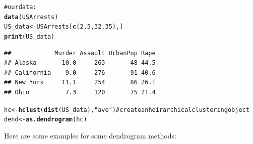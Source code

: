 \documentclass[shortnames,nojss,article]{jss}\usepackage{graphicx, color}
\makeatletter
\newcommand{\hlfunctioncall}[1]{\textcolor[rgb]{0.501960784313725,0,0.329411764705882}{\textbf{#1}}}%
\newcommand{\hlstring}[1]{\textcolor[rgb]{0.6,0.6,1}{#1}}%
\newcommand{\hlcomment}[1]{\textcolor[rgb]{0.180392156862745,0.6,0.341176470588235}{#1}}%
\newenvironment{kframe}{%
 \def\at@end@of@kframe{}%
 \ifinner\ifhmode%
  \def\at@end@of@kframe{\end{minipage}}%
  \begin{minipage}{\columnwidth}%
 \fi\fi%
 \def\FrameCommand##1{\hskip\@totalleftmargin \hskip-\fboxsep
 \colorbox{shadecolor}{##1}\hskip-\fboxsep
     \hskip-\linewidth \hskip-\@totalleftmargin \hskip\columnwidth}%
 \MakeFramed {\advance\hsize-\width
   \@totalleftmargin\z@ \linewidth\hsize
   \@setminipage}}%
 {\par\unskip\endMakeFramed%
 \at@end@of@kframe}
\newenvironment{knitrout}{}{} %
\makeatother
\begin{document}
\begin{knitrout}
\color{fgcolor}\begin{kframe}
\begin{alltt}
\hlcomment{# our data:}
\hlfunctioncall{data}(USArrests)
US_data <- USArrests[\hlfunctioncall{c}(2, 5, 32, 35), ]
\hlfunctioncall{print}(US_data)
\end{alltt}
\begin{verbatim}
##            Murder Assault UrbanPop Rape
## Alaska       10.0     263       48 44.5
## California    9.0     276       91 40.6
## New York     11.1     254       86 26.1
## Ohio          7.3     120       75 21.4
\end{verbatim}
\begin{alltt}

hc <- \hlfunctioncall{hclust}(\hlfunctioncall{dist}(US_data), \hlstring{"ave"})  # create an heirarchical clustering object
dend <- \hlfunctioncall{as.dendrogram}(hc)
\end{alltt}
\end{kframe}
\end{knitrout}



Here are some examples for some dendrogram methods:
\end{document}
